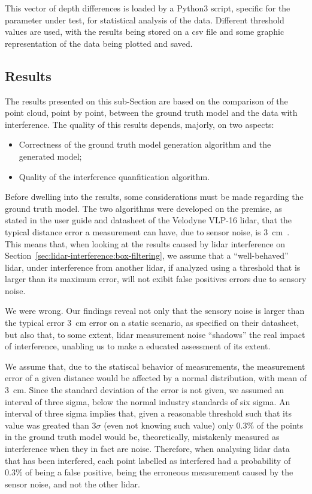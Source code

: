 This vector of depth differences is loaded by a Python3 script, specific for the parameter under test, for statistical analysis of the data. Different threshold values are used, with the results being stored on a \ac{csv} file and some graphic representation of the data being plotted and saved.

\subsection{Results}
\label{subsec:lidar-interference:point-to-point-analysis-results}
The results presented on this sub-Section are based on the comparison of the point cloud, point by point, between the ground truth model and the data with interference. The quality of this results depends, majorly, on two aspects:

\begin{itemize}
	\item Correctness of the ground truth model generation algorithm and the generated model;
	\item Quality of the interference quanfitication algorithm.
\end{itemize}

Before dwelling into the results, some considerations must be made regarding the ground truth model. The two algorithms were developed on the premise, as stated in the user guide and datasheet of the Velodyne VLP-16 \ac{lidar}, that the typical distance error a measurement can have, due to sensor noise, is \SI{3}{\centi\meter}~\cite{VLP16}. This means that, when looking at the results caused by \ac{lidar} interference on Section~\ref{sec:lidar-interference:box-filtering}, we assume that a ``well-behaved'' \ac{lidar}, under interference from another \ac{lidar}, if analyzed using a threshold that is larger than its maximum error, will not exibit false positives errors due to sensory noise.

We were wrong. Our findings reveal not only that the sensory noise is larger than the typical error \SI{3}{\centi\meter} error on a static scenario, as specified on their datasheet,\cite{VLP16} but also that, to some extent, \ac{lidar} measurement noise ``shadows'' the real impact of interference, unabling us to make a educated assessment of its extent.

We assume that, due to the statiscal behavior of measurements, the measurement error of a given distance would be affected by a normal distribution, with mean of \SI{3}{\centi\meter}. Since the standard deviation of the error is not given, we assumed an interval of three sigma, below the normal industry standards of six sigma\citeneeded. An interval of three sigma implies that, given a reasonable threshold such that its value was greated than $3\sigma$ (even not knowing such value) only 0.3\% of the points in the ground truth model would be, theoretically, mistakenly measured as interference when they in fact are noise. Therefore, when analysing \ac{lidar} data that has been interfered, each point labelled as interfered had a probability of $0.3\%$ of being a false positive, being the erroneous measurement caused by the sensor noise, and not the other \ac{lidar}.

